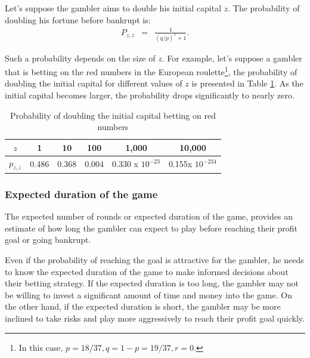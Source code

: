 \documentclass[11pt,twoside]{article}
\numberwithin{Theorem}{section}
\numberwithin{Definition}{section}
\numberwithin{Lemma}{section}
\numberwithin{Algorithm}{section}
\numberwithin{equation}{section}
\begin{document}
Let's suppose the gambler aims to double his initial capital $z$. The probability of doubling his fortune before bankrupt is:
\begin{eqnarray*}
P_{z, z}&=& \frac{1}{(q/p)^{z} +1}. 
\end{eqnarray*}

Such a probability depends on the size of $z$. For example, let's suppose a gambler that is betting on the red numbers in the European roulette\footnote{In this case, $p = 18/37, q = 1-p = 19/37, r = 0$.}, the probability of doubling the initial capital for different values of $z$ is presented in Table \ref{prob_example}. As the initial capital becomes larger, the probability drops significantly to nearly zero.

\begin{table}[h!]
\centering
\caption{Probability of doubling the initial capital betting on red numbers} \label{prob_example}
\begin{tabular}{|c|c|c|c|c|c|}
\hline
$z$ & 1 & 10 &  100 &  1,000 & 10,000\\
\hline
\hline
$p_{z,z}$&0.486&0.368&0.004&0.330 x $10^{-23}$& 0.155x $10^{-234}$\\
\hline
\end{tabular}
\end{table}


\subsubsection{Expected duration of the game}
The expected number of rounds or expected duration of the game, provides an estimate of how long the gambler can expect to play before reaching their profit goal or going bankrupt.

Even if the probability of reaching the goal is attractive for the gambler, he needs to know the expected duration of the game to make informed decisions about their betting strategy. If the expected duration is too long, the gambler may not be willing to invest a significant amount of time and money into the game. On the other hand, if the expected duration is short, the gambler may be more inclined to take risks and play more aggressively to reach their profit goal quickly.
\end{document}
